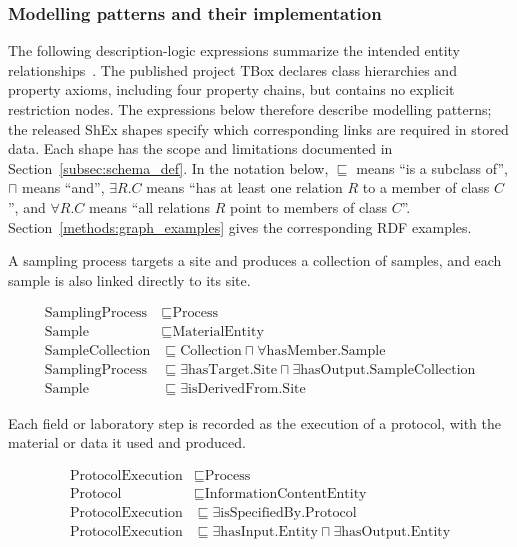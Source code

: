 \begin{revision}
\subsubsection{Modelling patterns and their implementation}



The following description-logic expressions summarize the intended entity relationships~\cite{dlhandbook}. The published project TBox declares class hierarchies and property axioms, including four property chains, but contains no explicit restriction nodes. The expressions below therefore describe modelling patterns; the released ShEx shapes specify which corresponding links are required in stored data. Each shape has the scope and limitations documented in Section~\ref{subsec:schema_def}. In the notation below, $\sqsubseteq$
means ``is a subclass of'', $\sqcap$ means ``and'', $\exists R.C$ means
``has at least one relation $R$ to a member of class $C$'', and
$\forall R.C$ means ``all relations $R$ point to members of class $C$''.
Section~\ref{methods:graph_examples} gives the corresponding RDF examples.

A sampling process targets a site and produces a collection of samples, and each sample is also linked directly to its site.

\begin{small}
\begin{align}
	\label{eq:sampling}
	\text{SamplingProcess} & \sqsubseteq \text{Process} \\
	\text{Sample} & \sqsubseteq \text{MaterialEntity} \\
    \text{SampleCollection} & \sqsubseteq \text{Collection} \sqcap
        \forall \text{hasMember}.\text{Sample} \\
	\text{SamplingProcess} & \sqsubseteq \exists
                                 \text{hasTarget}.\text{Site} \sqcap
                                 \exists
                                 \text{hasOutput}.\text{SampleCollection} \\
	\text{Sample} & \sqsubseteq \exists \text{isDerivedFrom}.\text{Site}
\end{align}
\end{small}

Each field or laboratory step is recorded as the execution of a
protocol, with the material or data it used and produced.

\begin{small}
\begin{align}
	\label{eq:protocol}
	\text{ProtocolExecution} & \sqsubseteq \text{Process} \\
	\text{Protocol} & \sqsubseteq \text{InformationContentEntity} \\
	\text{ProtocolExecution} & \sqsubseteq \exists
	    \text{isSpecifiedBy}.\text{Protocol} \\
	\text{ProtocolExecution} & \sqsubseteq \exists
	    \text{hasInput}.\text{Entity} \sqcap \exists
	    \text{hasOutput}.\text{Entity}
\end{align}
\end{small}


\end{revision}
